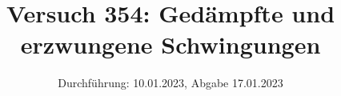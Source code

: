 

\title{Versuch 354: Gedämpfte und erzwungene Schwingungen}
\date{Durchführung: 10.01.2023, Abgabe 17.01.2023}


\maketitle
\thispagestyle{empty} 
\tableofcontents
\newpage
\setcounter{page}{1}






\printbibliography
\newpage



